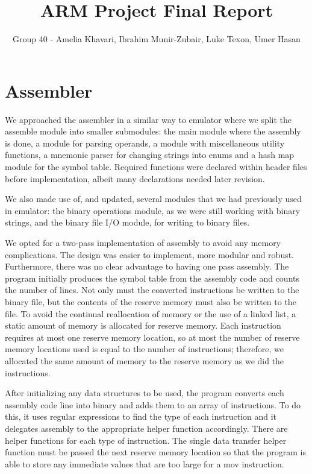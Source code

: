 \documentclass[11pt]{article}
\begin{document}
\title{ARM Project Final Report}
\author{Group 40 - Amelia Khavari, Ibrahim Munir-Zubair, Luke Texon, Umer Hasan}

\maketitle

\section{Assembler}
We approached the assembler in a similar way to emulator where we split the 
assemble module into smaller submodules: the main module where the assembly is done, 
a module for parsing operands, a module with miscellaneous utility functions, 
a mnemonic parser for changing strings into enums and 
a hash map module for the symbol table. Required functions were declared  within header files 
before implementation, albeit many declarations needed later revision.

We also made use of, and updated, several modules that we had previously used in emulator: 
the binary operations module, as we were still working with binary strings, 
and the binary file I/O module, for writing to binary files.     

We opted for a two-pass implementation of assembly to avoid any memory complications. The design was easier to implement, more modular and robust. Furthermore, there was no clear advantage to having one pass assembly. 
The program initially produces the symbol table from the assembly code and counts the number of lines.
Not only must the converted instructions be written to the binary file, but the contents of the reserve memory
must also be written to the file. To avoid the continual reallocation of memory or the use of a linked list, 
a static amount of memory is allocated for reserve memory. 
Each instruction requires at most one reserve memory location, so at most the number of 
reserve memory locations used is equal to the number of instructions; therefore, we allocated the 
same amount of memory to the reserve memory as we did the instructions.

After initializing any data structures to be used, the program converts each assembly 
code line into binary and adds them to an array of instructions. 
To do this, it uses regular expressions to find the type of each instruction and
it delegates assembly to the appropriate helper function accordingly.
There are helper functions for each type of instruction. The single data transfer helper function 
must be passed the next reserve memory location 
so that the program is able to store any immediate values that are too large for a mov instruction.
\end{document}
